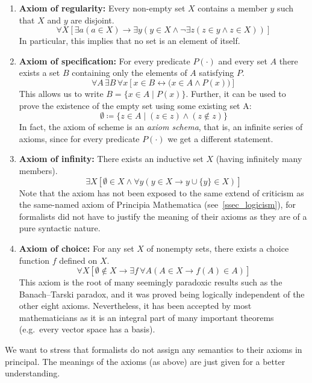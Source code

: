 \documentclass[hidelinks]{article}
\begin{document}
\begin{enumerate}
    \item \textbf{Axiom of regularity:} Every non-empty set $X$ contains a member $y$ such that $X$ and $y$ are disjoint.
\begin{equation*}
\forall X [\exists a ( a \in X) \rightarrow \exists y ( y \in X \land \lnot \exists z (z \in y \land z \in X))]
\end{equation*}
In particular, this implies that no set is an element of itself.
    \item \textbf{Axiom of specification:} For every predicate $P(\cdot)$ and every set $A$ there exists a set $B$ containing only the elements of $A$ satisfying $P$.
\begin{equation*}
\forall A\,\exists B\,\forall x[x\in B \leftrightarrow \bigl(x\in A \land P(x)\bigr)]
\end{equation*}
This allows us to write $B=\{x\in A\mid P(x)\}$. Further, it can be used to prove the existence of the empty set using some existing set A:
\begin{equation*}
\emptyset\coloneqq\{z\in A\mid (z\in z)\land(z\notin z)\}
\end{equation*}
In fact, the axiom of scheme is an \textit{axiom schema}, that is, an infinite series of axioms, since for every predicate $P(\cdot)$ we get a different statement.
    \item \textbf{Axiom of infinity:} There exists an inductive set $X$ (having infinitely many members).
\begin{equation*}
\exists X \left [\emptyset \in X \land \forall y (y \in X \rightarrow y\cup\{y\}  \in X)\right]
\end{equation*}
Note that the axiom has not been exposed to the same extend of criticism as the same-named axiom of Principia Mathematica (see~\ref{ssec_logicism}), for formalists did not have to justify the meaning of their axioms as they are of a pure syntactic nature.
    \item \textbf{Axiom of choice:} For any set $X$ of nonempty sets, there exists a choice function $f$ defined on $X$. 
\begin{equation*}
\forall X \left[ \emptyset \notin X \rightarrow \exists f\,\forall A(A\in X\rightarrow f(A) \in A ) \right]
\end{equation*}
This axiom is the root of many seemingly paradoxic results such as the Banach–Tarski paradox, and it was proved being logically independent of the other eight axioms. Nevertheless, it has been accepted by most mathematicians as it is an integral part of many important theorems (e.g.\ every vector space has a basis).
\end{enumerate}
\normalsize
We want to stress that formalists do not assign any semantics to their axioms in principal. The meanings of the axioms (as above) are just given for a better understanding.
\end{document}
